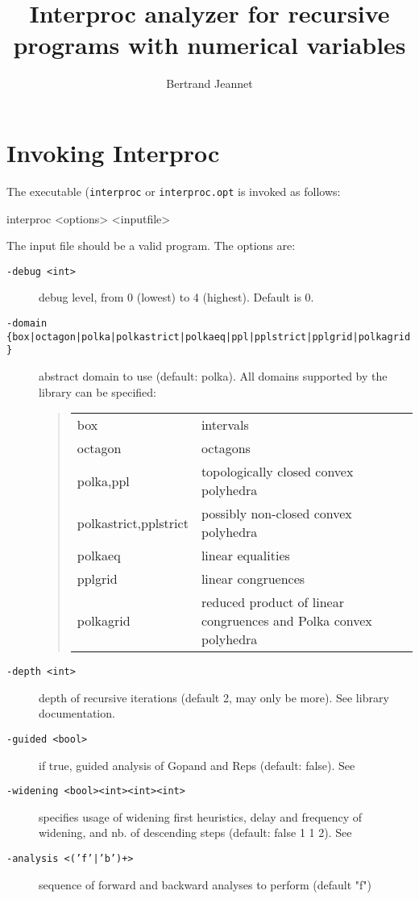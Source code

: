 \documentclass[a4paper,11pt]{article}
\title{Interproc analyzer for recursive programs with numerical variables}
\date{}
\author{Bertrand Jeannet}
\begin{document}
\maketitle
\tableofcontents

\section{Invoking Interproc }

The executable (\texttt{interproc} or \texttt{interproc.opt} is
invoked as follows:
\begin{example}
  interproc <options> <inputfile>
\end{example}
The input file should be a valid  program.
The options are:
\begin{description}
\item [\texttt{-debug <int>}] debug level, from 0 (lowest) to 4
  (highest). Default is 0.
\item [\texttt{-domain
    \{box|octagon|polka|polkastrict|polkaeq|ppl|pplstrict|pplgrid|polkagrid\}}]
  abstract domain to use (default: polka). All domains supported
  by the 
  library can be specified:
  \begin{quote}
    \begin{tabular}{l|l}
      box & intervals \\
      octagon & octagons \\
      polka,ppl & topologically closed convex polyhedra \\
      polkastrict,pplstrict & possibly non-closed convex polyhedra \\
      polkaeq & linear equalities \\
      pplgrid & linear congruences \\
      polkagrid & reduced product of linear congruences and Polka convex polyhedra
    \end{tabular}
  \end{quote}
\item [\texttt{-depth <int>}] depth of recursive iterations
  (default 2, may only be more). See
  library documentation.
\item [\texttt{-guided <bool>}] if true, guided analysis of Gopand
  and Reps (default: false). See
\item [\texttt{-widening <bool><int><int><int>}] specifies usage
  of widening first heuristics, delay and frequency of widening,
  and nb. of descending steps (default: false 1 1 2). See
\item [\texttt{-analysis <('f'|'b')+>}] sequence of forward and backward analyses to perform (default "f")
\end{description}
\end{document}
